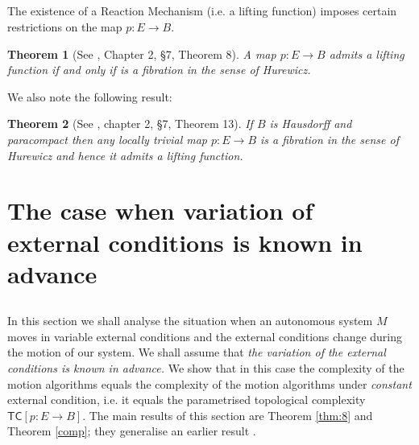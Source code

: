 \documentclass[11pt]{amsart}
\newtheorem{theorem}{Theorem}%
\def\tc{{\mathsf{TC}}}
\begin{document}
\subsection{} The existence of a Reaction Mechanism (i.e. a lifting function) imposes certain restrictions on the map $p: E\to B$. 

\begin{theorem}[See \cite{Sp}, Chapter 2, \S7, Theorem 8] A map $p: E\to B$ admits a lifting function if and only if is a fibration in the sense of Hurewicz. 
\end{theorem}


We also note the following result:

\begin{theorem}[See \cite{Sp}, chapter 2, \S 7, Theorem 13] If $B$ is Hausdorff and paracompact then 
any locally trivial map $p:E\to B$ is a fibration in the sense of Hurewicz and hence it admits a lifting function. 
\end{theorem}

\section{The case when variation of external conditions is known in advance}\label{sec:3}

\subsection{} In this section we shall analyse the situation when an autonomous system $M$ moves in variable external conditions and the external conditions change during the motion of our system. 
We shall assume that
 {\it the variation of the external conditions is known in advance. } We show that in this case the complexity of the motion algorithms equals the complexity of the motion algorithms under {\it constant} external condition, i.e. it equals the parametrised topological complexity $\tc[p: E\to B]$. 
 The main results of this section are Theorem \ref{thm:8} and Theorem \ref{comp}; they generalise  an earlier result \cite{FGY}.
 
\end{document}
